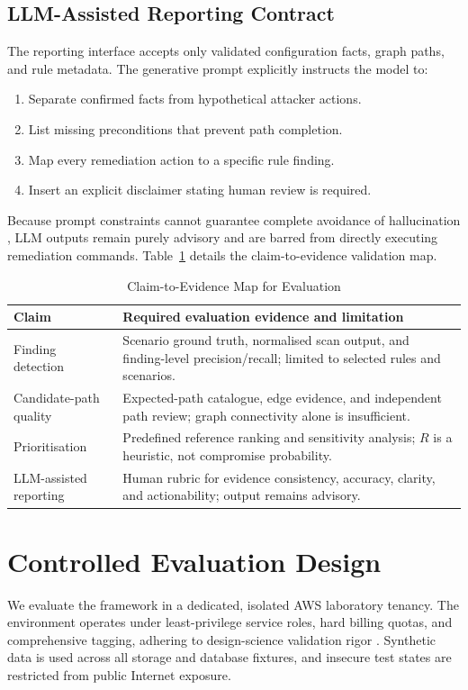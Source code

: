 \documentclass[conference]{IEEEtran}
\begin{document}
\subsection{LLM-Assisted Reporting Contract}
The reporting interface accepts only validated configuration facts, graph paths, and rule metadata. The generative prompt explicitly instructs the model to:
\begin{enumerate}
\item Separate confirmed facts from hypothetical attacker actions.
\item List missing preconditions that prevent path completion.
\item Map every remediation action to a specific rule finding.
\item Insert an explicit disclaimer stating human review is required.
\end{enumerate}
Because prompt constraints cannot guarantee complete avoidance of hallucination \cite{xu2024llmcybersecurity,openai2023gpt4}, LLM outputs remain purely advisory and are barred from directly executing remediation commands. Table~\ref{tab:claims} details the claim-to-evidence validation map.

\begin{table}[t]
\caption{Claim-to-Evidence Map for Evaluation}
\label{tab:claims}
\centering
\footnotesize
\begin{tabular}{p{} p{}}
\toprule
Claim & Required evaluation evidence and limitation \\
\midrule
Finding detection & Scenario ground truth, normalised scan output, and finding-level precision/recall; limited to selected rules and scenarios. \\
Candidate-path quality & Expected-path catalogue, edge evidence, and independent path review; graph connectivity alone is insufficient. \\
Prioritisation & Predefined reference ranking and sensitivity analysis; $R$ is a heuristic, not compromise probability. \\
LLM-assisted reporting & Human rubric for evidence consistency, accuracy, clarity, and actionability; output remains advisory. \\
\bottomrule
\end{tabular}
\end{table}

\section{Controlled Evaluation Design}
We evaluate the framework in a dedicated, isolated AWS laboratory tenancy. The environment operates under least-privilege service roles, hard billing quotas, and comprehensive tagging, adhering to design-science validation rigor \cite{hevner2004design}. Synthetic data is used across all storage and database fixtures, and insecure test states are restricted from public Internet exposure.
\end{document}
